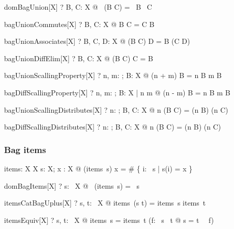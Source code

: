 \documentclass{article}
\begin{document}
\begin{theorem}{domBagUnion}[X]
   \vdash? \forall B, C: \bag X @ \dom~(B \uplus C) = \dom~B \cup \dom~C
\end{theorem}
\begin{theorem}{bagUnionCommutes}[X]
   \vdash? \forall B, C: \bag X @ B \uplus C = C \uplus B
\end{theorem}
\begin{theorem}{bagUnionAssociates}[X]
   \vdash? \forall B, C, D: \bag X @ (B \uplus C) \uplus D = B \uplus (C \uplus D)
\end{theorem}
\begin{theorem}{bagUnionDiffElim}[X]
   \vdash? \forall B, C: \bag X @ (B \uplus C) \uminus C = B
\end{theorem}
\begin{theorem}{bagUnionScallingProperty}[X]
   \vdash? \forall n, m: \nat; B: \bag X @ (n + m) \otimes B = n \otimes B \uplus m \otimes B
\end{theorem}
\begin{theorem}{bagDiffScallingProperty}[X]
   \vdash? \forall n, m: \nat; B: \bag X | n \geq m @ (n - m) \otimes B = n \otimes B \uminus m \otimes B
\end{theorem}
\begin{theorem}{bagUnionScallingDistributes}[X]
   \vdash? \forall n: \nat; B, C: \bag X @ n \otimes (B \uplus C) = (n \otimes B) \uplus (n \otimes C)
\end{theorem}
\begin{theorem}{bagDiffScallingDistributes}[X]
   \vdash? \forall n: \nat; B, C: \bag X @ n \otimes (B \uminus C) = (n \otimes B) \uminus (n \otimes C)
\end{theorem}

\subsubsection*{Bag items}

\begin{gendef}[X]
  items: \seq X \fun \bag X
\where
  \forall s: \seq X; x : X @ (items~s) \bcount x = \# \{ i: \dom~s | s(i) = x \}
\end{gendef}

\begin{theorem}{domBagItems}[X]
   \vdash? \forall s: \seq~X @ \dom~(items~s) = \ran~s
\end{theorem}
\begin{theorem}{itemsCatBagUplus}[X]
   \vdash? \forall s, t: \seq~X @ items~(s \cat t) = items~s \uplus items~t
\end{theorem}
\begin{theorem}{itemsEquiv}[X]
   \vdash? \forall s, t: \seq~X @ items~s = items~t \iff (\exists f: \dom~s \bij \dom~t @ s = t~ \circ ~f)
\end{theorem}
\end{document}
